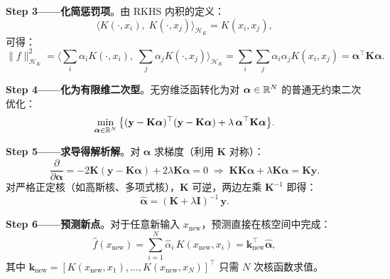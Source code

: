 \textbf{Step 3——化简惩罚项}。由 RKHS 内积的定义：
\[
\big\langle K(\cdot, x_i),\; K(\cdot, x_j) \big\rangle_{\mathcal{H}_K} = K(x_i, x_j),
\]
可得：
\[
\|f\|_{\mathcal{H}_K}^2 = \Big\langle \sum_i \alpha_i K(\cdot, x_i),\;\sum_j \alpha_j K(\cdot, x_j) \Big\rangle_{\mathcal{H}_K}
= \sum_i \sum_j \alpha_i \alpha_j K(x_i, x_j) = \boldsymbol{\alpha}^\top \mathbf{K} \boldsymbol{\alpha}.
\]

\textbf{Step 4——化为有限维二次型}。无穷维泛函转化为对 $\boldsymbol{\alpha} \in \mathbb{R}^N$ 的普通无约束二次优化：
\begin{equation}\label{eq:kernel_ridge_obj}
    \min_{\boldsymbol{\alpha} \in \mathbb{R}^N} \big\{ (\mathbf{y} - \mathbf{K}\boldsymbol{\alpha})^\top (\mathbf{y} - \mathbf{K}\boldsymbol{\alpha}) + \lambda\,\boldsymbol{\alpha}^\top \mathbf{K} \boldsymbol{\alpha} \big\}.
\end{equation}

\textbf{Step 5——求导得解析解}。对 $\boldsymbol{\alpha}$ 求梯度（利用 $\mathbf{K}$ 对称）：
\[
\frac{\partial}{\partial\boldsymbol{\alpha}} = -2\mathbf{K}(\mathbf{y} - \mathbf{K}\boldsymbol{\alpha}) + 2\lambda \mathbf{K}\boldsymbol{\alpha} = 0
\;\Longrightarrow\; \mathbf{K}\mathbf{K}\boldsymbol{\alpha} + \lambda\mathbf{K}\boldsymbol{\alpha} = \mathbf{K}\mathbf{y}.
\]
对严格正定核（如高斯核、多项式核），$\mathbf{K}$ 可逆，两边左乘 $\mathbf{K}^{-1}$ 即得：
\begin{equation}\label{eq:kernel_ridge_solution}
    \boxed{\hat{\boldsymbol{\alpha}} = (\mathbf{K} + \lambda\mathbf{I})^{-1}\,\mathbf{y}.}
\end{equation}

\textbf{Step 6——预测新点}。对于任意新输入 $x_{\text{new}}$，预测直接在核空间中完成：
\[
\hat{f}(x_{\text{new}}) = \sum_{i=1}^{N} \hat{\alpha}_i\,K(x_{\text{new}}, x_i) = \mathbf{k}_{\text{new}}^\top \hat{\boldsymbol{\alpha}},
\]
其中 $\mathbf{k}_{\text{new}} = [K(x_{\text{new}}, x_1), \ldots, K(x_{\text{new}}, x_N)]^\top$ 只需 $N$ 次核函数求值。

